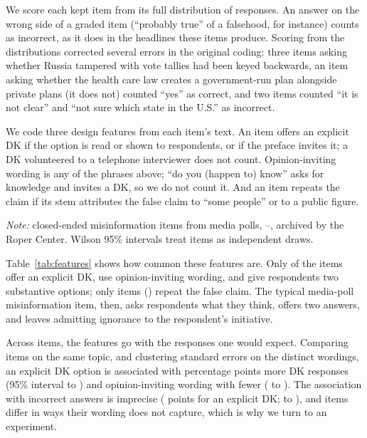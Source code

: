 \documentclass[11pt]{article}
\begin{document}
We score each kept item from its full distribution of responses. An answer on the wrong side of a graded item (``probably true'' of a falsehood, for instance) counts as incorrect, as it does in the headlines these items produce. Scoring from the distributions corrected several errors in the original coding: three items asking whether Russia tampered with vote tallies had been keyed backwards, an item asking whether the health care law creates a government-run plan alongside private plans (it does not) counted ``yes'' as correct, and two items counted ``it is not clear'' and ``not sure which state in the U.S.'' as incorrect.

We code three design features from each item's text. An item offers an explicit DK if the option is read or shown to respondents, or if the preface invites it; a DK volunteered to a telephone interviewer does not count. Opinion-inviting wording is any of the phrases above; ``do you (happen to) know'' asks for knowledge and invites a DK, so we do not count it. And an item repeats the claim if its stem attributes the false claim to ``some people'' or to a public figure.

\begin{table}[t]
\centering
\caption{Design features of media-poll misinformation items}
\label{tab:features}
\TableStyle

\begin{minipage}{0.85\linewidth}
\vspace{0.5em}\footnotesize \emph{Note:} \nKept{} closed-ended misinformation items from media polls, \firstYear{}--\lastYear{}, archived by the Roper Center. Wilson 95\% intervals treat items as independent draws.
\end{minipage}
\end{table}

Table~\ref{tab:features} shows how common these features are. Only \shareDkShown{} of the items offer an explicit DK, \shareOpinion{} use opinion-inviting wording, and \shareBinary{} give respondents two substantive options; only \nCue{} items (\shareCue{}) repeat the false claim. The typical media-poll misinformation item, then, asks respondents what they think, offers two answers, and leaves admitting ignorance to the respondent's initiative.

Across items, the features go with the responses one would expect. Comparing items on the same topic, and clustering standard errors on the \nWordings{} distinct wordings, an explicit DK option is associated with \dkShownDk{} percentage points more DK responses (95\% interval \dkShownDkLower{} to \dkShownDkUpper{}) and opinion-inviting wording with \opinionDk{} fewer (\opinionDkLower{} to \opinionDkUpper{}). The association with incorrect answers is imprecise (\dkShownIncorrect{} points for an explicit DK; \dkShownIncorrectLower{} to \dkShownIncorrectUpper{}), and items differ in ways their wording does not capture, which is why we turn to an experiment.
\end{document}
